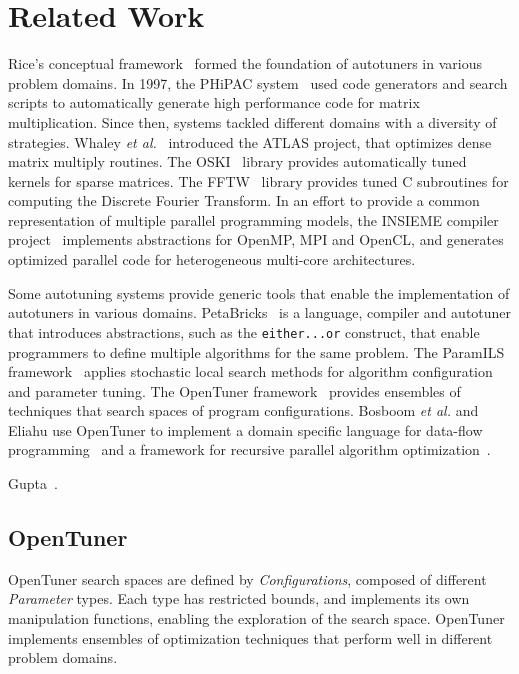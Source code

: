 \documentclass[a4paper, 12pt]{article}
\begin{document}
\section{Related Work} \label{sec:related}

Rice's conceptual framework~\cite{rice1976algorithm} formed the foundation
of autotuners in various problem domains.  In 1997, the PHiPAC
system~\cite{bilmes1997phipac} used code generators and search scripts to
automatically generate high performance code
for matrix multiplication. Since then, systems tackled different domains with a
diversity of strategies. Whaley \emph{et al.}~\cite{whaley1998atlas} introduced
the ATLAS project, that optimizes dense matrix multiply routines. The
OSKI~\cite{vuduc2005oski} library provides automatically tuned kernels for
sparse matrices. The FFTW~\cite{frigo1998fftw} library provides tuned C
subroutines for computing the Discrete Fourier Transform.  In an effort to
provide a common representation of multiple parallel programming models, the
INSIEME compiler project~\cite{jordan2012multi} implements abstractions for
OpenMP, MPI and OpenCL, and generates optimized parallel code for heterogeneous
multi-core architectures.

Some autotuning systems provide generic tools that enable the implementation of
autotuners in various domains. PetaBricks~\cite{ansel2009petabricks} is a
language, compiler and autotuner that introduces abstractions, such as the
\texttt{\footnotesize either...or} construct, that enable programmers to define
multiple algorithms for the same problem.  The ParamILS
framework~\cite{hutter2009paramils} applies stochastic local search methods
for algorithm configuration and parameter tuning.  The OpenTuner
framework~\cite{ansel2014opentuner} provides ensembles of techniques that
search spaces of program configurations. Bosboom \emph{et al.} and Eliahu use
OpenTuner to implement a domain specific language for data-flow
programming~\cite{bosboom2014streamjit} and a framework for recursive parallel
algorithm optimization~\cite{eliahu2015frpa}.

Gupta~\cite{gupta2012exploring,gupta2014evaluating}.

\subsection{OpenTuner} \label{sec:opt}

OpenTuner search spaces are defined by \emph{Configurations}, composed of
different \emph{Parameter} types. Each type has restricted bounds, and
implements its own manipulation functions, enabling the exploration of the
search space.  OpenTuner implements ensembles of optimization
techniques that perform well in different problem domains.
\end{document}
